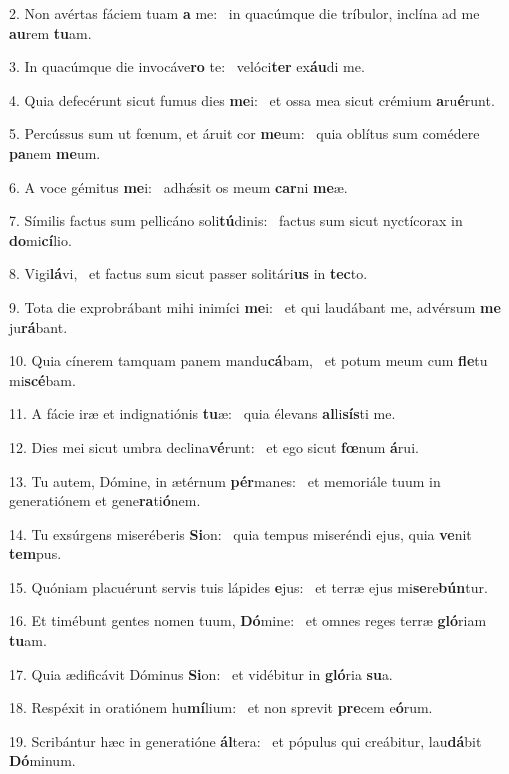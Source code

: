 2. Non avértas fáciem tuam \textbf{a} me: \ast\  in quacúmque die tríbulor, inclína ad me \textbf{au}rem \textbf{tu}am.\

3. In quacúmque die invocáve\textbf{ro} te: \ast\  velóci\textbf{ter} ex\textbf{áu}di me.\

4. Quia defecérunt sicut fumus dies \textbf{me}i: \ast\  et ossa mea sicut crémium \textbf{a}ru\textbf{é}runt.\

5. Percússus sum ut fœnum, et áruit cor \textbf{me}um: \ast\  quia oblítus sum comédere \textbf{pa}nem \textbf{me}um.\

6. A voce gémitus \textbf{me}i: \ast\  adhǽsit os meum \textbf{car}ni \textbf{me}æ.\

7. Símilis factus sum pellicáno soli\textbf{tú}dinis: \ast\  factus sum sicut nyctícorax in \textbf{do}mi\textbf{cí}lio.\

8. Vigi\textbf{lá}vi, \ast\  et factus sum sicut passer solitári\textbf{us} in \textbf{tec}to.\

9. Tota die exprobrábant mihi inimíci \textbf{me}i: \ast\  et qui laudábant me, advérsum \textbf{me} ju\textbf{rá}bant.\

10. Quia cínerem tamquam panem mandu\textbf{cá}bam, \ast\  et potum meum cum \textbf{fle}tu mi\textbf{scé}bam.\

11. A fácie iræ et indignatiónis \textbf{tu}æ: \ast\  quia élevans \textbf{al}li\textbf{sís}ti me.\

12. Dies mei sicut umbra declina\textbf{vé}runt: \ast\  et ego sicut \textbf{fœ}num \textbf{á}rui.\

13. Tu autem, Dómine, in ætérnum \textbf{pér}manes: \ast\  et memoriále tuum in generatiónem et gene\textbf{ra}ti\textbf{ó}nem.\

14. Tu exsúrgens miseréberis \textbf{Si}on: \ast\  quia tempus miseréndi ejus, quia \textbf{ve}nit \textbf{tem}pus.\

15. Quóniam placuérunt servis tuis lápides \textbf{e}jus: \ast\  et terræ ejus mi\textbf{se}re\textbf{bún}tur.\

16. Et timébunt gentes nomen tuum, \textbf{Dó}mine: \ast\  et omnes reges terræ \textbf{gló}riam \textbf{tu}am.\

17. Quia ædificávit Dóminus \textbf{Si}on: \ast\  et vidébitur in \textbf{gló}ria \textbf{su}a.\

18. Respéxit in oratiónem hu\textbf{mí}lium: \ast\  et non sprevit \textbf{pre}cem e\textbf{ó}rum.\

19. Scribántur hæc in generatióne \textbf{ál}tera: \ast\  et pópulus qui creábitur, lau\textbf{dá}bit \textbf{Dó}minum.\

